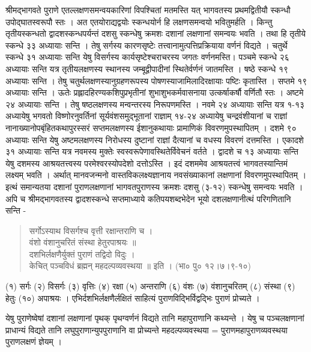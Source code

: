 श्रीमद्भागवते पुराणे एतल्लक्षणसमन्वयकारिणां विपश्चितां मतमस्ति यत् भागवतस्य प्रथमद्वितीयौ स्कन्धौ उपोद्घातस्वरूपौ स्तः । अत एतयोराद्यद्वयोः स्कन्धयोर्न हि लक्षणसमन्वयो भवितुमर्हति । किन्तु तृतीयस्कन्धतो द्वादशस्कन्धपर्यन्तं दशसु स्कन्धेषु क्रमशः दशानां लक्षणानां समन्वयः भवति । तथा हि तृतीये स्कन्धे ३३ अध्यायाः सन्ति । तेषु सर्गस्य कारणसृष्टेः तत्त्वानामुत्पत्तिप्रक्रियाया वर्णनं विद्यते । चतुर्थे स्कन्धे ३१ अध्यायाः सन्ति येषु विसर्गस्य कार्यसृष्टेश्चराचरस्य जगतः वर्णनमस्ति। पञ्चमे स्कन्धे २६ अध्यायाः सन्ति यत्र तृतीयलक्षणस्य स्थानस्य जम्बूद्वीपादीनां स्थितेर्वर्णनं जातमस्ति । षष्ठे स्कन्धे १९ अध्यायाः सन्ति । तेषु चतुर्थलक्षणस्यानुग्रहणरूपस्य पोषणस्याजामिलादिरक्षायाः पष्टिः कृतास्ति । सप्तमे १९ अध्यायाः सन्ति । ऊतेः प्रह्लादहिरण्यकशिपुप्रभृतीनां शुभाशुभकर्मवासनाया उत्कर्षाकर्षौ वर्णितौ स्तः । अष्टमे २४ अध्यायाः सन्ति । तेषु षष्ठलक्षणस्य मन्वन्तरस्य निरूपणमस्ति । नवमे २४ अध्यायाः सन्ति यत्र १-१३ अध्यायेषु भगवतो विष्णोरनुवर्तिनां सूर्यवंशसमुद्भूतानां राज्ञाम् १४-२४ अध्यायेषु चन्द्रवंशीयानां च राज्ञां नानाख्यानोपबृंहितकथापुरस्सरं सप्तमलक्षणस्य ईशानुकथायाः प्रामाणिकं विवरणमुपस्थापितम् । दशमे ९० अध्यायाः सन्ति येषु अष्टमलक्षणस्य निरोधस्य दुष्टानां राज्ञां दैत्यानां च वधस्य विवरणं दत्तमस्ति । एकादशे ३१ अध्यायाः सन्ति यत्र नवमस्य मुक्तेः स्वस्वरूपेणावस्थितेर्विवेचनं वर्तते । द्वादशे च १३ अध्यायाः सन्ति येषु दशमस्य आश्रयतत्त्वस्य परमेश्वरस्योपदेशो दत्तोऽस्ति । इदं दशममेव आश्रयतत्त्वं भागवतस्यान्तिमं लक्ष्यम् भवति । अर्थात् मानवजन्मनो वास्तविकलक्ष्यज्ञानाय नवसंख्याकानां लक्षणानां विवरणमुपस्थापितम् । इत्थं समान्यतया दशानां पुराणलक्षणानां भागवतपुराणस्य क्रमशः दशसु (३-१२) स्कन्धेषु समन्वयः भवति । अपि च श्रीमद्भागवतस्य द्वादशस्कन्धे सप्तमाध्याये कतिपयशब्दभेदेन भूयो दशलक्षणानीत्थं परिगणितानि सन्ति -
\begin{verse}
सर्गोऽस्याथ विसर्गश्च वृत्ती रक्षान्तराणि च ।\\
वंशो वंशानुचरितं संस्था हेतुरपाश्रयः ॥\\
दशभिर्लक्षणैर्युक्तं पुराणं तद्विदो विदुः ।\\
केचित् पञ्चविधं ब्रह्मन् महदल्पव्यवस्थया ॥ इति । (भा० पु० १२।७।९-१०)
\end{verse}
(१) सर्गः (२) विसर्गः (३) वृत्तिः (४) रक्षा (५) अन्तराणि (६) वंशः (७) वंशानुचरितम् (८) संस्था (९) हेतुः (१०) अपाश्रयः । एभिर्दशभिर्लक्षणैर्लक्षितं साहित्यं पुराणविद्भिर्विद्वद्भिः पुराणं प्रोच्यते ।

येषु पुराणेष्वेषां दशानां लक्षणानां पृथक् पृथग्वर्णनं विद्यते तानि महापुराणानि कथ्यन्ते । येषु च पञ्चलक्षणानां प्राधान्यं विद्यते तानि लघुपुराणान्युपपुराणानि वा प्रोच्यन्ते महदल्पव्यवस्थया = पुराणमहापुराणव्यवस्थया पुराणलक्षणं ज्ञेयम् ।

